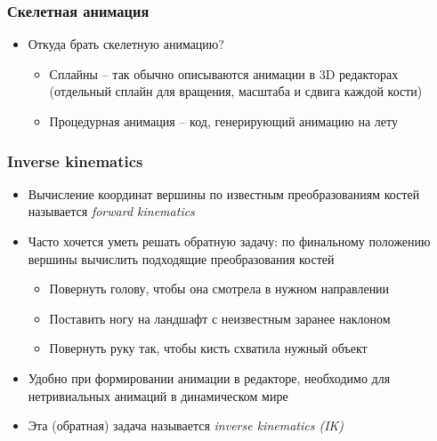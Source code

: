 \documentclass{beamer}
\begin{document}
\begin{frame}[fragile]
\frametitle{Скелетная анимация}
\begin{itemize}
\item Откуда брать скелетную анимацию?
\pause
\begin{itemize}
\item Сплайны -- так обычно описываются анимации в 3D редакторах (отдельный сплайн для вращения, масштаба и сдвига каждой кости)
\pause
\item Процедурная анимация -- код, генерирующий анимацию на лету
\end{itemize}
\end{itemize}
\end{frame}

\begin{frame}[fragile]
\frametitle{Inverse kinematics}
\begin{itemize}
\item Вычисление координат вершины по известным преобразованиям костей называется \textit{forward kinematics}
\pause
\item Часто хочется уметь решать обратную задачу: по финальному положению вершины вычислить подходящие преобразования костей
\pause
\begin{itemize}
\item Повернуть голову, чтобы она смотрела в нужном направлении
\pause
\item Поставить ногу на ландшафт с неизвестным заранее наклоном
\pause
\item Повернуть руку так, чтобы кисть схватила нужный объект
\end{itemize}
\pause
\item Удобно при формировании анимации в редакторе, необходимо для нетривиальных анимаций в динамическом мире
\pause
\item Эта (обратная) задача называется \textit{inverse kinematics (IK)}
\end{itemize}
\end{frame}
\end{document}
